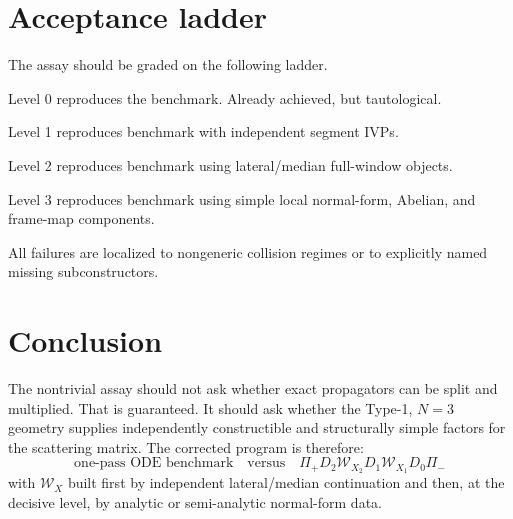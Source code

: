 \documentclass[11pt]{article}
\newcommand{\calW}{\mathcal W}
\begin{document}
\section{Acceptance ladder}

The assay should be graded on the following ladder.
\begin{description}[leftmargin=2.0em]
  \item[Bookkeeping success.] Level 0 reproduces the benchmark. Already achieved, but tautological.
  \item[Independent numerical success.] Level 1 reproduces benchmark with independent segment IVPs.
  \item[Continuation success.] Level 2 reproduces benchmark using lateral/median full-window objects.
  \item[Structural success.] Level 3 reproduces benchmark using simple local normal-form, Abelian, and frame-map components.
  \item[Theorem-shaping success.] All failures are localized to nongeneric collision regimes or to explicitly named missing subconstructors.
\end{description}

\section{Conclusion}

The nontrivial assay should not ask whether exact propagators can be split and multiplied. That is guaranteed. It should ask whether the Type-1, $N=3$ geometry supplies independently constructible and structurally simple factors for the scattering matrix. The corrected program is therefore:
\[
\boxed{\text{one-pass ODE benchmark}}
\quad\text{versus}\quad
\boxed{\Pi_+D_2\calW_{X_2}D_1\calW_{X_1}D_0\Pi_-}
\]
with $\calW_X$ built first by independent lateral/median continuation and then, at the decisive level, by analytic or semi-analytic normal-form data.

\appendix
\end{document}
